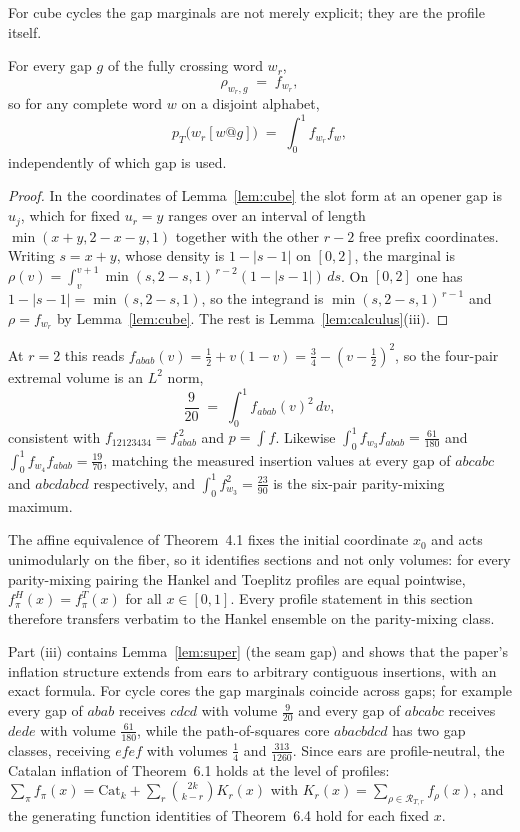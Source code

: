 For cube cycles the gap marginals are not merely explicit; they are the
profile itself.

\begin{corollary}\label{cor:selfsim}
For every gap $g$ of the fully crossing word $w_r$,
\[
\rho_{w_r,g}\;=\;f_{w_r},
\]
so for any complete word $w$ on a disjoint alphabet,
\[
p_T\bigl(w_r[w@g]\bigr)\;=\;\int_0^1 f_{w_r}f_w ,
\]
independently of which gap is used.
\end{corollary}

\begin{proof}
In the coordinates of Lemma~\ref{lem:cube} the slot form at an opener
gap is $u_j$, which for fixed $u_r=y$ ranges over an interval of length
$\min(x+y,2-x-y,1)$ together with the other $r-2$ free prefix
coordinates.  Writing $s=x+y$, whose density is $1-|s-1|$ on $[0,2]$,
the marginal is
$\rho(v)=\int_v^{v+1}\min(s,2-s,1)^{\,r-2}(1-|s-1|)\,ds$.  On $[0,2]$
one has $1-|s-1|=\min(s,2-s,1)$, so the integrand is
$\min(s,2-s,1)^{\,r-1}$ and $\rho=f_{w_r}$ by
Lemma~\ref{lem:cube}.  The rest is Lemma~\ref{lem:calculus}(iii).
\end{proof}

At $r=2$ this reads $f_{abab}(v)=\tfrac12+v(1-v)=\tfrac34-(v-\tfrac12)^2$,
so the four-pair extremal volume is an $L^2$ norm,
\[
\frac{9}{20}\;=\;\int_0^1 f_{abab}(v)^2\,dv ,
\]
consistent with $f_{12123434}=f_{abab}^{\,2}$ and $p=\int f$.  Likewise
$\int_0^1f_{w_3}f_{abab}=\tfrac{61}{180}$ and
$\int_0^1f_{w_4}f_{abab}=\tfrac{19}{70}$, matching the measured
insertion values at every gap of $abcabc$ and $abcdabcd$ respectively,
and $\int_0^1f_{w_3}^2=\tfrac{23}{90}$ is the six-pair parity-mixing
maximum.

The affine equivalence of Theorem~4.1 fixes the initial coordinate
$x_0$ and acts unimodularly on the fiber, so it identifies sections and
not only volumes: for every parity-mixing pairing the Hankel and
Toeplitz profiles are equal pointwise, $f^H_\pi(x)=f^T_\pi(x)$ for all
$x\in[0,1]$.  Every profile statement in this section therefore
transfers verbatim to the Hankel ensemble on the parity-mixing class.

Part (iii) contains Lemma~\ref{lem:super} (the seam gap) and shows that
the paper's inflation structure extends from ears to arbitrary
contiguous insertions, with an exact formula.  For cycle cores the gap
marginals coincide across gaps; for example every gap of $abab$ receives
$cdcd$ with volume $\tfrac9{20}$ and every gap of $abcabc$ receives
$dede$ with volume $\tfrac{61}{180}$, while the path-of-squares core
$abacbdcd$ has two gap classes, receiving $efef$ with volumes
$\tfrac14$ and $\tfrac{313}{1260}$.  Since ears are profile-neutral, the
Catalan inflation of Theorem~6.1 holds at the level of profiles:
$\sum_{\pi}f_\pi(x)=\mathrm{Cat}_k+\sum_{r}\binom{2k}{k-r}K_r(x)$ with
$K_r(x)=\sum_{\rho\in\mathcal R_{T,r}}f_\rho(x)$, and the generating
function identities of Theorem~6.4 hold for each fixed $x$.

